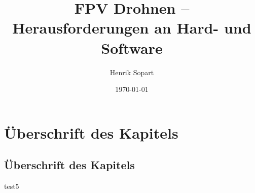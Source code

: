 \documentclass[a4paper,11pt]{scrartcl}
\title{FPV Drohnen – Herausforderungen an Hard- und Software}
\author{Henrik Sopart}
\date{\today}
\begin{document}
\maketitle
\newpage
\tableofcontents
\newpage
\section[Überschrift für das Inhaltsverzeichnis]{Überschrift des Kapitels}
\subsection[Überschrift für das Inhaltsverzeichnis]{Überschrift des Kapitels}

test5
\end{document}
